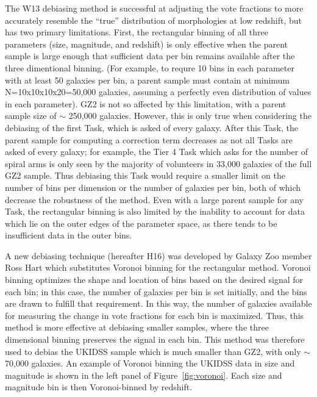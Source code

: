 The W13 debiasing method is successful at adjusting the vote fractions to more accurately resemble the ``true'' distribution of morphologies at low redshift, but has two primary limitations. First, the rectangular binning of all three parameters (size, magnitude, and redshift) is only effective when the parent sample is large enough that sufficient data per bin remains available after the three dimentional binning. (For example, to requre 10 bins in each parameter with at least 50 galaxies per bin, a parent sample must contain at minimum N=10x10x10x20=50,000 galaxies, assuming a perfectly even distribution of values in each parameter). GZ2 is not so affected by this limitation, with a parent sample size of $\sim$ 250,000 galaxies. However, this is only true when considering the debiasing of the first Task, which is asked of every galaxy. After this Task, the parent sample for computing a correction term decreases as not all Tasks are asked of every galaxy; for example, the Tier 4 Task which asks for the number of spiral arms is only seen by the majority of volunteers in 33,000 galaxies of the full GZ2 sample. Thus debiasing this Task would require a smaller limit on the number of bins per dimension or the number of galaxies per bin, both of which decrease the robustness of the method. Even with a large parent sample for any Task, the rectangular binning is also limited by the inability to account for data which lie on the outer edges of the parameter space, as there tends to be insufficient data in the outer bins. 

A new debiasing technique (hereafter H16) was developed by Galaxy Zoo member Ross Hart \citep{Hart2016} which substitutes Voronoi binning for the rectangular method. Voronoi binning optimizes the shape and location of bins based on the desired signal for each bin; in this case, the number of galaxies per bin is set initially, and the bins are drawn to fulfill that requirement. In this way, the number of galaxies available for measuring the change in vote fractions for each bin is maximized. Thus, this method is more effective at debiasing smaller samples, where the three dimensional binning preserves the signal in each bin. This method was therefore used to debias the UKIDSS sample which is much smaller than GZ2, with only $\sim$70,000 galaxies. An example of Voronoi binning the UKIDSS data in size and magnitude is shown in the left panel of Figure~\ref{fig:voronoi}. Each size and magnitude bin is then Voronoi-binned by redshift. 

